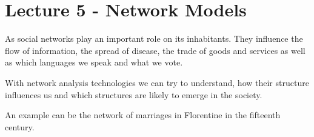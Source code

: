 \section{Lecture 5 - Network Models} %
\label{sec:lecture_5_network_models}
As social networks play an important role on its inhabitants.
They influence the flow of information,
the spread of disease,
the trade of goods and services as well as which languages we speak and what we vote.

With network analysis technologies we can try to understand,
how their structure influences us
and which structures are likely to emerge in the society.

An example can be the network of marriages in Florentine in the fifteenth century.
